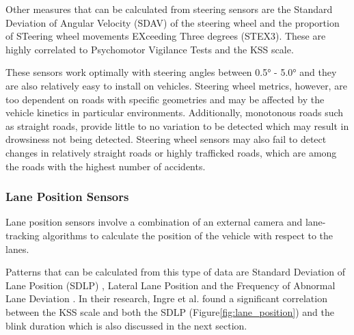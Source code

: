 \documentclass[a4paper]{article}
\begin{document}
Other measures that can be calculated from steering sensors are the
Standard Deviation of Angular Velocity (SDAV) of the steering wheel and
the proportion of STeering wheel movements EXceeding Three degrees
(STEX3). These are highly correlated to Psychomotor Vigilance Tests and
the KSS scale. \cite{forsman_efficient_2013}

These sensors work optimally with steering angles between 0.5° - 5.0°
and they are also relatively easy to install on vehicles. Steering wheel
metrics, however, are too dependent on roads with specific geometries
and may be affected by the vehicle kinetics in particular environments.
Additionally, monotonous roads such as straight roads, provide little to
no variation to be detected which may result in drowsiness not being
detected. Steering wheel sensors may also fail to detect changes in
relatively straight roads or highly trafficked roads, which are among
the roads with the highest number of accidents.
\cite{eskandarian_evaluation_2007}

\hypertarget{lane-position-sensors}{%
\subsubsection{Lane Position Sensors}\label{lane-position-sensors}}

Lane position sensors involve a combination of an external camera and
lane-tracking algorithms to calculate the position of the vehicle with
respect to the lanes.

Patterns that can be calculated from this type of data are Standard
Deviation of Lane Position (SDLP) \cite{ingre_subjective_2006}, Lateral
Lane Position \cite{cheng_driver_2012} and the Frequency of Abnormal
Lane Deviation \cite{hu_experimental_2017}. In their research, Ingre et
al. \cite{ingre_subjective_2006} found a significant correlation between
the KSS scale and both the SDLP (Figure\ref{fig:lane_position}) and the blink duration
which is also discussed in the next section.
\end{document}
